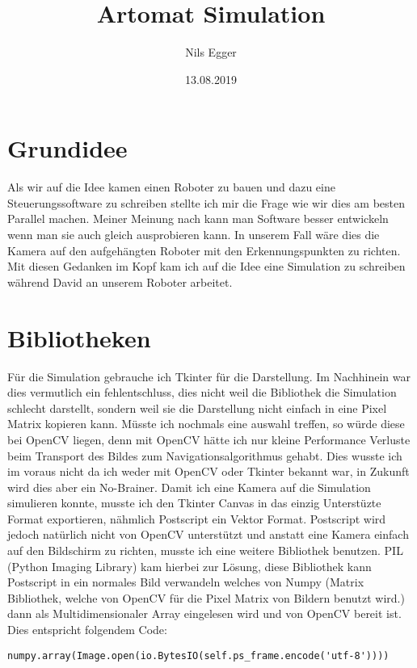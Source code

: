 \documentclass[12pt]{article}
\title{Artomat Simulation}
\author{Nils Egger}
\date{13.08.2019}
\begin{document}
\maketitle

\section{Grundidee}

Als wir auf die Idee kamen einen Roboter zu bauen und dazu eine Steuerungssoftware zu schreiben stellte ich mir die Frage wie wir dies am besten Parallel machen. Meiner Meinung nach kann man Software besser entwickeln wenn man sie auch gleich ausprobieren kann. In unserem Fall wäre dies die Kamera auf den aufgehängten Roboter mit den Erkennungspunkten zu richten. Mit diesen Gedanken im Kopf kam ich auf die Idee eine Simulation zu schreiben während David an unserem Roboter arbeitet.

\section{Bibliotheken}
Für die Simulation gebrauche ich Tkinter für die Darstellung. Im Nachhinein war dies vermutlich ein fehlentschluss, dies nicht weil die Bibliothek die Simulation schlecht darstellt, sondern weil sie die Darstellung nicht einfach in eine Pixel Matrix kopieren kann.
Müsste ich nochmals eine auswahl treffen, so würde diese bei OpenCV liegen, denn mit OpenCV hätte ich nur kleine Performance Verluste beim Transport des Bildes zum Navigationsalgorithmus gehabt. Dies wusste ich im voraus nicht da ich weder mit OpenCV oder Tkinter bekannt war, in Zukunft wird dies aber ein No-Brainer.
Damit ich eine Kamera auf die Simulation simulieren konnte, musste ich den Tkinter Canvas in das einzig Unterstüzte Format exportieren, nähmlich Postscript ein Vektor Format. Postscript wird jedoch natürlich nicht von OpenCV unterstützt und anstatt eine Kamera einfach auf den Bildschirm zu richten, musste ich eine weitere Bibliothek benutzen. PIL (Python Imaging Library) kam hierbei zur Lösung, diese Bibliothek kann Postscript in ein normales Bild verwandeln welches von Numpy (Matrix Bibliothek, welche von OpenCV für die Pixel Matrix von Bildern benutzt wird.) dann als Multidimensionaler Array eingelesen wird und von OpenCV bereit ist.
Dies entspricht folgendem Code:
\begin{lstlisting}
numpy.array(Image.open(io.BytesIO(self.ps_frame.encode('utf-8'))))
\end{lstlisting}
\end{document}
